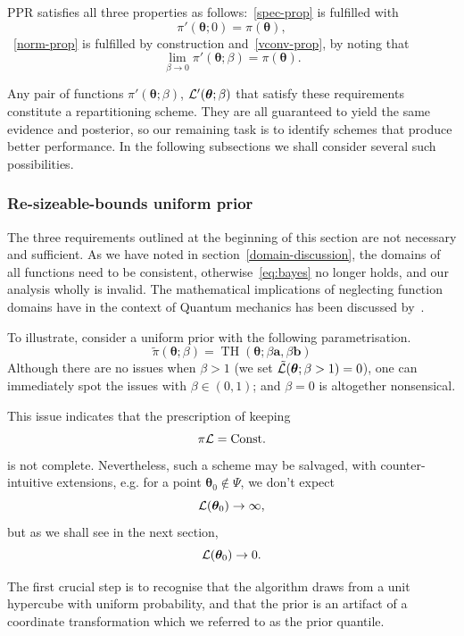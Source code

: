 \documentclass[usenatbib]{mnras}
\DeclareMathOperator{\TopHat}{TH}
\begin{document}
PPR satisfies all three properties as follows:~\vref{spec-prop} is
fulfilled with \[\pi'(\bm{\theta}; 0) =\pi(\bm{\theta}),\]~\cref{norm-prop} is
fulfilled by construction and~\cref{vconv-prop}, by noting that
\[\lim_{\beta \rightarrow 0} \pi'(\bm{\theta}; \beta) =
  \pi(\bm{\theta}).\]

Any pair of functions \(\pi'(\bm{\theta}; \beta)\),
\({\cal L}'(\bm{\theta}; \beta)\) that satisfy these requirements
constitute a repartitioning scheme. They are all guaranteed to yield
the same evidence and posterior, so our remaining task is to identify
schemes that produce better performance. In the following subsections
we shall consider several such possibilities.

\subsubsection{Re-sizeable-bounds uniform prior}\label{sec:orga67f872}

The three requirements outlined at the beginning of this section are
not necessary and sufficient. As we have noted in
section~\vref{domain-discussion}, the domains of all functions need to
be consistent, otherwise~\vref{eq:bayes} no longer holds, and our
analysis wholly is invalid. The mathematical implications of
neglecting function domains have in the context of Quantum mechanics
has been discussed by~\cite{Gieres_2000}.

To illustrate, consider a uniform prior with the following
parametrisation.
\begin{equation*}
  \tilde{\pi}(\bm{\theta}; \beta) = \TopHat(\bm{\theta}; \beta \bm{a}, \beta \bm{b})
\end{equation*}
Although there are no issues when \(\beta>1\) (we set
\({\cal\tilde{L}}(\bm{\theta}; \beta>1)=0\)), one can immediately
spot the issues with \(\beta \in (0,1)\); and \(\beta=0\) is
altogether nonsensical.

This issue indicates that the prescription of keeping \[\pi {\cal
	L} = \text{Const.}\] is not complete. Nevertheless, such a scheme
may be salvaged, with counter-intuitive extensions, e.g. for a
point \(\bm{\theta}_{0} \notin \Psi\), we don't expect
\[{\cal L}(\bm{\theta}_{0}) \rightarrow \infty,\] but as we shall see in
the next section, \[{\cal L}(\bm{\theta}_{0}) \rightarrow 0.\]

The first crucial step is to recognise that the algorithm draws
from a unit hypercube with uniform probability, and that the prior
is an artifact of a coordinate transformation which we referred to
as the prior quantile.
\end{document}
